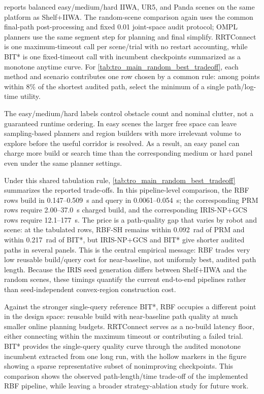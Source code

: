 \documentclass[journal]{IEEEtran}
\DeclareRobustCommand{\textsc}[1]{\textnormal{\MakeUppercase{#1}}}
\newcommand{\rbf}{\textsc{RBF}}
\begin{document}
 reports balanced easy/medium/hard IIWA, UR5, and Panda scenes on the same platform as Shelf+IIWA. The random-scene comparison again uses the common final-path post-processing and fixed 0.01 joint-space audit protocol; OMPL planners use the same segment step for planning and final simplify. RRTConnect is one maximum-timeout call per scene/trial with no restart accounting, while BIT* is one fixed-timeout call with incumbent checkpoints summarized as a monotone anytime curve. For \cref{tab:tro_main_random_best_tradeoff}, each method and scenario contributes one row chosen by a common rule: among points within 8\% of the shortest audited path, select the minimum of a single path/log-time utility.

The easy/medium/hard labels control obstacle count and nominal clutter, not a guaranteed runtime ordering. In easy scenes the larger free space can leave sampling-based planners and region builders with more irrelevant volume to explore before the useful corridor is resolved. As a result, an easy panel can charge more build or search time than the corresponding medium or hard panel even under the same planner settings.

Under this shared tabulation rule, \cref{tab:tro_main_random_best_tradeoff}
summarizes the reported trade-offs. In this pipeline-level comparison, the
\rbf{} rows build in 0.147--0.509~s and query in 0.0061--0.054~s; the
corresponding PRM rows require 2.00--37.0~s charged build, and the
corresponding IRIS-NP+GCS rows require 12.1--177~s. The price is a path-quality
gap that varies by robot and scene: at the tabulated rows, RBF-SH remains within
0.092~rad of PRM and within 0.217~rad of BIT*, but IRIS-NP+GCS and BIT* give
shorter audited paths in several panels. This is the central empirical message:
\rbf{} trades very low reusable build/query cost for near-baseline, not
uniformly best, audited path length. Because the IRIS seed generation differs between
Shelf+IIWA and the random scenes, these timings quantify the current end-to-end
pipelines rather than seed-independent convex-region construction cost.

Against the stronger single-query reference BIT*, \rbf{} occupies a different point in the design space: reusable build with near-baseline path quality at much smaller online planning budgets. RRTConnect serves as a no-build latency floor, either connecting within the maximum timeout or contributing a failed trial. BIT* provides the single-query quality curve through the audited monotone incumbent extracted from one long run, with the hollow markers in the figure showing a sparse representative subset of nonimproving checkpoints. This comparison shows the observed path-length/time trade-off of the implemented \rbf{} pipeline, while leaving a broader strategy-ablation study for future work.
\end{document}
